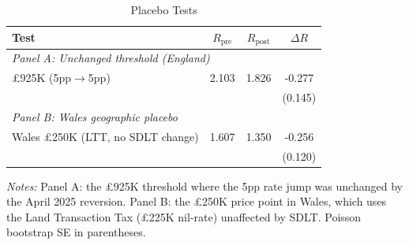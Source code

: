 \begin{table}[htbp]
\centering
\caption{Placebo Tests}
\label{tab:placebo}
\begin{tabular}{lccc}
\hline\hline
Test & $R_{\text{pre}}$ & $R_{\text{post}}$ & $\Delta R$ \\
\hline
\multicolumn{4}{l}{\textit{Panel A: Unchanged threshold (England)}} \\
\pounds 925K (5pp$\rightarrow$5pp) & 2.103 & 1.826 & -0.277 \\
 & & & (0.145) \\
\hline
\multicolumn{4}{l}{\textit{Panel B: Wales geographic placebo}} \\
Wales \pounds 250K (LTT, no SDLT change) & 1.607 & 1.350 & -0.256 \\
 & & & (0.120) \\
\hline\hline
\end{tabular}
\begin{tablenotes}
\item \textit{Notes:} Panel A: the \pounds 925K threshold where the 5pp rate jump was unchanged by the April 2025 reversion. Panel B: the \pounds 250K price point in Wales, which uses the Land Transaction Tax (\pounds 225K nil-rate) unaffected by SDLT. Poisson bootstrap SE in parentheses.
\end{tablenotes}
\end{table}
